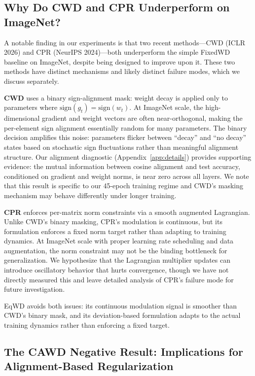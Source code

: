 \documentclass{article}
\begin{document}
\subsection{Why Do CWD and CPR Underperform on ImageNet?}
\label{sec:cwd_cpr}

A notable finding in our experiments is that two recent methods---CWD
(ICLR 2026) and CPR (NeurIPS 2024)---both underperform the simple
FixedWD baseline on ImageNet, despite being designed to improve upon it.
These two methods have distinct mechanisms and likely distinct failure
modes, which we discuss separately.

\textbf{CWD} uses a binary sign-alignment mask: weight decay is applied
only to parameters where $\text{sign}(g_t) = \text{sign}(w_t)$. At
ImageNet scale, the high-dimensional gradient and weight vectors are
often near-orthogonal, making the per-element sign alignment essentially
random for many parameters. The binary decision amplifies this noise:
parameters flicker between ``decay'' and ``no decay'' states based on
stochastic sign fluctuations rather than meaningful alignment structure.
Our alignment diagnostic (Appendix~\ref{app:details}) provides supporting evidence: the
mutual information between cosine alignment and test accuracy,
conditioned on gradient and weight norms, is near zero across all
layers. We note that this result is specific to our 45-epoch training
regime and CWD's masking mechanism may behave differently under longer
training.

\textbf{CPR} enforces per-matrix norm constraints via a smooth augmented
Lagrangian. Unlike CWD's binary masking, CPR's modulation is continuous,
but its formulation enforces a fixed norm target rather than adapting to
training dynamics. At ImageNet scale with proper learning rate
scheduling and data augmentation, the norm constraint may not be the
binding bottleneck for generalization. We hypothesize that the
Lagrangian multiplier updates can introduce oscillatory behavior that
hurts convergence, though we have not directly measured this and leave
detailed analysis of CPR's failure mode for future investigation.

EqWD avoids both issues: its continuous modulation signal is smoother
than CWD's binary mask, and its deviation-based formulation adapts to
the actual training dynamics rather than enforcing a fixed target.

\subsection{The CAWD Negative Result: Implications for Alignment-Based Regularization}
\label{sec:cawd}
\end{document}
